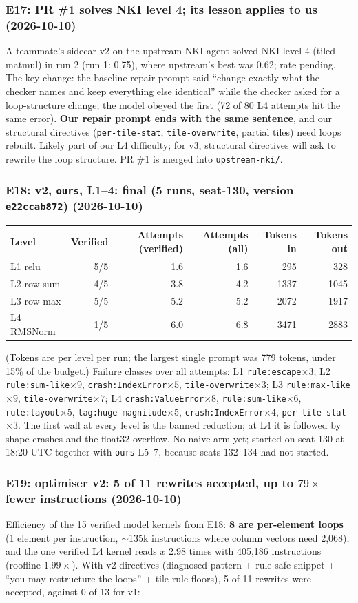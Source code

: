 \documentclass[11pt]{article}
\newcommand{\code}[1]{\texttt{#1}}
\newcommand{\entry}[2]{\subsubsection*{#1 \textnormal{\small(#2)}}}
\begin{document}
\entry{E17: PR \#1 solves NKI level 4; its lesson applies to us}{2026-10-10}
A teammate's sidecar v2 on the upstream NKI agent solved NKI level 4 (tiled matmul) in run 2 (run 1:
0.75), where upstream's best was 0.62; rate pending. The key change: the baseline repair prompt said
``change exactly what the checker names and keep everything else identical'' while the checker asked
for a loop-structure change; the model obeyed the first (72 of 80 L4 attempts hit the same error).
\textbf{Our repair prompt ends with the same sentence}, and our structural directives
(\code{per-tile-stat}, \code{tile-overwrite}, partial tiles) need loops rebuilt. Likely part of our L4
difficulty; for v3, structural directives will ask to rewrite the loop structure. PR \#1 is merged
into \code{upstream-nki/}.

\entry{E18: v2, \code{ours}, L1--4: final (5 runs, seat-130, version \code{e22ccab872})}{2026-10-10}
\begin{tabular}{@{}lrrrrr@{}}
\toprule
Level & Verified & Attempts (verified) & Attempts (all) & Tokens in & Tokens out \\
\midrule
L1 relu & 5/5 & 1.6 & 1.6 & 295 & 328 \\
L2 row sum & 4/5 & 3.8 & 4.2 & 1337 & 1045 \\
L3 row max & 5/5 & 5.2 & 5.2 & 2072 & 1917 \\
L4 RMSNorm & 1/5 & 6.0 & 6.8 & 3471 & 2883 \\
\bottomrule
\end{tabular}

\medskip
(Tokens are per level per run; the largest single prompt was 779 tokens, under 15\% of the budget.)
Failure classes over all attempts: L1 \code{rule:escape}$\times3$; L2 \code{rule:sum-like}$\times9$,
\code{crash:IndexError}$\times5$, \code{tile-overwrite}$\times3$; L3 \code{rule:max-like}$\times9$,
\code{tile-overwrite}$\times7$; L4 \code{crash:ValueError}$\times8$, \code{rule:sum-like}$\times6$,
\code{rule:layout}$\times5$, \code{tag:huge-magnitude}$\times5$, \code{crash:IndexError}$\times4$,
\code{per-tile-stat}$\times3$. The first wall at every level is the banned reduction; at L4 it is
followed by shape crashes and the float32 overflow. No naive arm yet; started on seat-130 at 18:20 UTC
together with \code{ours} L5--7, because seats 132--134 had not started.

\entry{E19: optimiser v2: 5 of 11 rewrites accepted, up to $79\times$ fewer instructions}{2026-10-10}
Efficiency of the 15 verified model kernels from E18: \textbf{8 are per-element loops} (1 element per
instruction, $\sim$135k instructions where column vectors need 2{,}068), and the one verified L4 kernel
reads $x$ 2.98 times with 405{,}186 instructions (roofline $1.99\times$). With v2 directives (diagnosed
pattern + rule-safe snippet + ``you may restructure the loops'' + tile-rule floors), 5 of 11 rewrites
were accepted, against 0 of 13 for v1:
\end{document}
